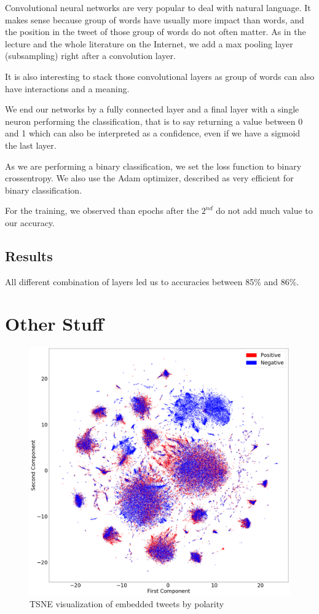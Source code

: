 \documentclass[10pt,conference,compsocconf]{IEEEtran}
\begin{document}
Convolutional neural networks are very popular to deal with natural language. It makes sense because group of words have usually more impact than words, and the position in the tweet of those group of words do not often matter.
As in the lecture and the whole literature on the Internet, we add a max pooling layer (subsampling) right after a convolution layer.

It is also interesting to stack those convolutional layers as group of words can also have interactions and a meaning.

We end our networks by a fully connected layer and a final layer with a single neuron performing the classification, that is to say returning a value between 0 and 1 which can also be interpreted as a confidence, even if we have a sigmoid the last layer.

As we are performing a binary classification, we set the loss function to binary crossentropy. We also use the Adam optimizer, described as very efficient for binary classification.

For the training, we observed than epochs after the $2^{nd}$ do not add much value to our accuracy.

\subsection{Results}

All different combination of layers led us to accuracies between 85\% and 86\%.

\section{Other Stuff}
\begin{figure}[h]
    \centering
    \includegraphics[width=\linewidth]{imag/tweets_tsne.png}
    \caption{TSNE visualization of embedded tweets by polarity}
    \label{fig:my_label}
\end{figure}
\end{document}
